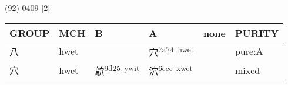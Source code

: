\documentclass[14pt,a4paper]{scrartcl}
\begin{document}
(92) 0409 {[}2{]}

\begin{longtable}[c]{@{}llllll@{}}
\toprule
\begin{minipage}[b]{0.14\columnwidth}\raggedright\strut
GROUP
\strut\end{minipage} &
\begin{minipage}[b]{0.14\columnwidth}\raggedright\strut
MCH
\strut\end{minipage} &
\begin{minipage}[b]{0.14\columnwidth}\raggedright\strut
B
\strut\end{minipage} &
\begin{minipage}[b]{0.14\columnwidth}\raggedright\strut
A
\strut\end{minipage} &
\begin{minipage}[b]{0.14\columnwidth}\raggedright\strut
none
\strut\end{minipage} &
\begin{minipage}[b]{0.14\columnwidth}\raggedright\strut
PURITY
\strut\end{minipage}\tabularnewline
\midrule
\endhead
\begin{minipage}[t]{0.14\columnwidth}\raggedright\strut
八
\strut\end{minipage} &
\begin{minipage}[t]{0.14\columnwidth}\raggedright\strut
hwet
\strut\end{minipage} &
\begin{minipage}[t]{0.14\columnwidth}\raggedright\strut
\strut\end{minipage} &
\begin{minipage}[t]{0.14\columnwidth}\raggedright\strut
穴\textsuperscript{7a74~hwet}
\strut\end{minipage} &
\begin{minipage}[t]{0.14\columnwidth}\raggedright\strut
\strut\end{minipage} &
\begin{minipage}[t]{0.14\columnwidth}\raggedright\strut
pure:A
\strut\end{minipage}\tabularnewline
\begin{minipage}[t]{0.14\columnwidth}\raggedright\strut
穴
\strut\end{minipage} &
\begin{minipage}[t]{0.14\columnwidth}\raggedright\strut
hwet
\strut\end{minipage} &
\begin{minipage}[t]{0.14\columnwidth}\raggedright\strut
鴥\textsuperscript{9d25~ywit}
\strut\end{minipage} &
\begin{minipage}[t]{0.14\columnwidth}\raggedright\strut
泬\textsuperscript{6cec~xwet}
\strut\end{minipage} &
\begin{minipage}[t]{0.14\columnwidth}\raggedright\strut
\strut\end{minipage} &
\begin{minipage}[t]{0.14\columnwidth}\raggedright\strut
mixed
\strut\end{minipage}\tabularnewline
\bottomrule
\end{longtable}
\end{document}
